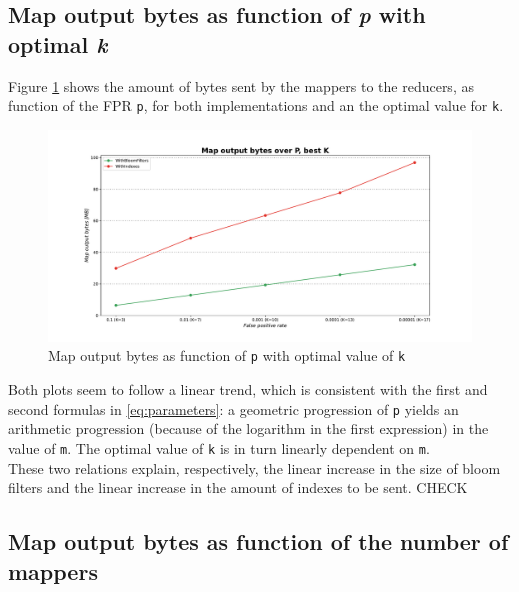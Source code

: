\subsection*{Map output bytes as function of \textit{p} with optimal \textit{k}}

Figure \ref{fig:MapOutputBytesP_bestK} shows the amount of bytes sent by the mappers to the reducers, as function of the FPR \texttt{p}, for both implementations and an the optimal value for \texttt{k}.\\

\begin{figure}[H]
    \begin{center}
        \includegraphics[scale=.45,trim={3cm 0 3cm 0},clip]{img/MapOutputBytesP_bestK.pdf}
    \end{center}
    \vspace*{-0.5cm}
    \caption{Map output bytes as function of \texttt{p} with optimal value of \texttt{k}}
    \label{fig:MapOutputBytesP_bestK}
\end{figure}


Both plots seem to follow a linear trend, which is consistent with the first and second formulas in \ref{eq:parameters}: a geometric progression of \texttt{p} yields an arithmetic progression (because of the logarithm in the first expression) in the value of \texttt{m}. The optimal value of \texttt{k} is in turn linearly dependent on \texttt{m}.\\
These two relations explain, respectively, the linear increase in the size of bloom filters and the linear increase in the amount of indexes to be sent. CHECK

\subsection*{Map output bytes as function of the number of mappers}

